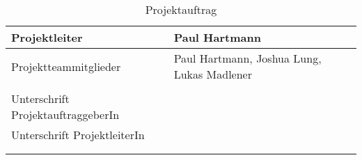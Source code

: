 \begin{longtable}{p{}|p{}}
  Projektleiter         & Paul Hartmann                                                                                  \\ \hline

  Projektteammitglieder & Paul Hartmann, Joshua Lung, Lukas Madlener                                                     \\ \hline

  \\
  Unterschrift ProjektauftraggeberIn                                                                                     \\ \hline
  Unterschrift ProjektleiterIn                                                                                           \\ \hline

  \multicolumn{2}{c}{}                                                                                                   \\

  \caption{Projektauftrag}
  \label{tab:projektauftrag}
\end{longtable}
